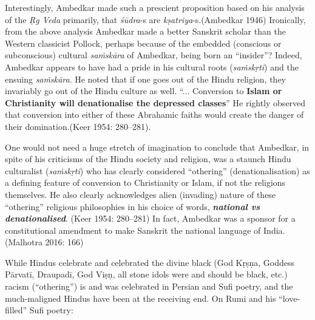 Interestingly, Ambedkar made such a prescient proposition based on his analysis of the \textit{Ṛg Veda} primarily, that \textit{śūdra}-s are \textit{kṣatriya}-s.\break (Ambedkar 1946) Ironically, from the above analysis Ambedkar made a better Sanskrit scholar than the Western classicist Pollock, perhaps because of the embedded (conscious or subconscious) cultural \textit{saṁskāra} of Ambedkar, being born an “insider”? Indeed, Ambedkar appears to have had a pride in his cultural roots (\textit{saṁskṛti}) and the ensuing \textit{saṁskāra}. He noted that if one goes out of the Hindu religion, they invariably go out of the Hindu culture as well. “... Conversion to \textbf{Islam or Christianity will denationalise the depressed classes}” He rightly observed that conversion into either of these Abrahamic faiths would create the danger of their domination.(Keer 1954: 280–281).

One would not need a huge stretch of imagination to conclude that Ambedkar, in spite of his criticisms of the Hindu society and religion, was a staunch Hindu culturalist (\textit{saṁskṛti}) who has clearly considered “othering” (denationalisation) as a defining feature of conversion to Christianity or Islam, if not the religions themselves. He also clearly acknowledges alien (invading) nature of these “othering” religious philosophies in his choice of words, \textit{\textbf{national vs denationalised}}. (Keer 1954: 280–281) In fact, Ambedkar was a sponsor for a constitutional amendment to make Sanskrit the national language of India. (Malhotra 2016: 166)

While Hindus celebrate and celebrated the divine black (God Kṛṣṇa, Goddess Pārvatī, Draupadī, God Viṣṇ, all stone idols were and should be black, etc.) racism (“othering”) is and was celebrated in Persian and Sufi poetry, and the much-maligned Hindus have been at the receiving end. On Rumi and his “love-filled” Sufi poetry:

